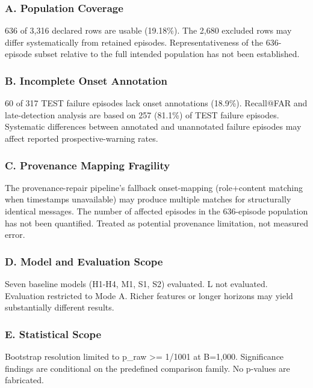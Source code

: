 \documentclass[
]{article}
\begin{document}
\subsubsection{A. Population Coverage}\label{a.-population-coverage}

636 of 3,316 declared rows are usable (19.18\%). The 2,680 excluded rows
may differ systematically from retained episodes. Representativeness of
the 636-episode subset relative to the full intended population has not
been established.

\subsubsection{B. Incomplete Onset
Annotation}\label{b.-incomplete-onset-annotation}

60 of 317 TEST failure episodes lack onset annotations (18.9\%).
Recall@FAR and late-detection analysis are based on 257 (81.1\%) of TEST
failure episodes. Systematic differences between annotated and
unannotated failure episodes may affect reported prospective-warning
rates.

\subsubsection{C. Provenance Mapping
Fragility}\label{c.-provenance-mapping-fragility}

The provenance-repair pipeline's fallback onset-mapping (role+content
matching when timestamps unavailable) may produce multiple matches for
structurally identical messages. The number of affected episodes in the
636-episode population has not been quantified. Treated as potential
provenance limitation, not measured error.

\subsubsection{D. Model and Evaluation
Scope}\label{d.-model-and-evaluation-scope}

Seven baseline models (H1-H4, M1, S1, S2) evaluated. L not evaluated.
Evaluation restricted to Mode A. Richer features or longer horizons may
yield substantially different results.

\subsubsection{E. Statistical Scope}\label{e.-statistical-scope}

Bootstrap resolution limited to p\_raw \textgreater= 1/1001 at B=1,000.
Significance findings are conditional on the predefined comparison
family. No p-values are fabricated.
\end{document}
